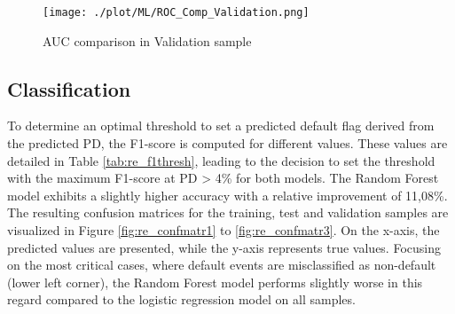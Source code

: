 \begin{figure}[H]
	\centering
	\texttt{[image: ./plot/ML/ROC\_Comp\_Validation.png]}
    \caption{AUC comparison in Validation sample}
    \label{fig:re_roc2}
\end{figure}

\subsection{Classification}
To determine an optimal threshold to set a predicted default flag derived from the predicted PD, the F1-score is computed for different values. These values are detailed in Table \ref{tab:re_f1thresh}, leading to the decision to set the threshold with the maximum F1-score at PD > 4\% for both models. The Random Forest model exhibits a slightly higher accuracy with a relative improvement of 11,08\%. The resulting confusion matrices for the training, test and validation samples are visualized in Figure \ref{fig:re_confmatr1} to \ref{fig:re_confmatr3}. On the x-axis, the predicted values are presented, while the y-axis represents true values. Focusing on the most critical cases, where default events are misclassified as non-default (lower left corner), the Random Forest model performs slightly worse in this regard compared to the logistic regression model on all samples.

